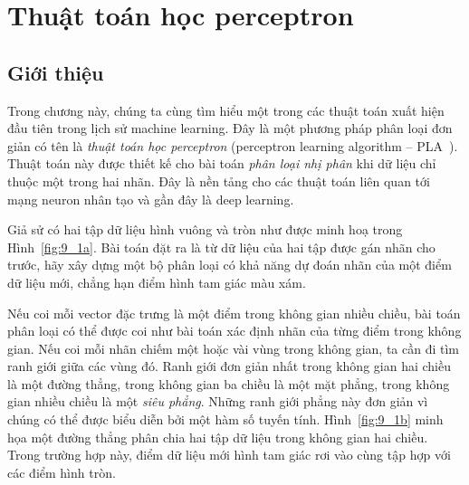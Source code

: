 \chapter{Thuật toán học perceptron}
\label{cha:pla}





\section{Giới thiệu}
Trong chương này, chúng ta cùng tìm hiểu một trong các thuật toán xuất hiện đầu
tiên trong lịch sử machine learning. Đây là một phương pháp phân loại đơn giản
có tên là \textit{thuật toán học perceptron} ({perceptron learning
algorithm} -- PLA~\cite{rosemblat1957perceptron}). Thuật toán này được thiết kế
cho bài toán \textit{phân loại nhị phân} khi dữ liệu chỉ thuộc một trong hai
nhãn. Đây là nền tảng cho các thuật toán liên quan tới mạng neuron nhân tạo và
gần đây là deep learning.




Giả sử có hai tập dữ liệu hình vuông và tròn như được minh hoạ trong
Hình~\ref{fig:9_1a}. Bài toán đặt ra là từ dữ liệu của hai tập được gán nhãn cho
trước, hãy xây dựng một bộ phân loại có khả năng dự đoán nhãn của một điểm
dữ liệu mới, chẳng hạn điểm hình tam giác màu xám.


Nếu coi mỗi vector đặc trưng là một điểm trong không gian nhiều chiều, bài toán
phân loại có thể được coi như bài toán xác định nhãn của từng điểm trong không
gian. Nếu coi mỗi nhãn {chiếm} một hoặc vài vùng trong không gian, ta cần đi tìm
{ranh giới} giữa các vùng đó. Ranh giới đơn giản nhất trong không gian hai chiều
là một đường thẳng, trong không gian ba chiều là một mặt phẳng, trong không gian
nhiều chiều là một \textit{siêu phẳng}. Những ranh giới phẳng này đơn giản vì
chúng có thể được biểu diễn bởi một hàm số tuyến tính. Hình~\ref{fig:9_1b} minh
họa một đường thẳng phân chia hai tập dữ liệu trong không gian hai chiều. Trong
trường hợp này, điểm dữ liệu mới hình tam giác rơi vào cùng tập hợp với các điểm
hình tròn.

